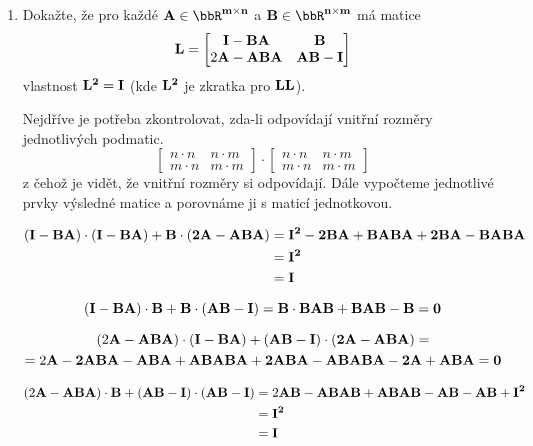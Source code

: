 \begin{enumerate}
    \item Dokažte, že pro každé \( \bf{A} \in \bbR^{m \times n} \) a \( \bf{B} \in \bbR^{n \times m} \) má matice 
    \[
        \bf{L} = 
        \begin{bmatrix}
            \bf{I} - \bf{B} \bf{A} & \bf{B} \\
            2 \bf{A} - \bf{A} \bf{B} \bf{A} & \bf{A} \bf{B} - \bf{I}
        \end{bmatrix}
    \]
    vlastnost \( \bf{L}^2 = \bf{I} \) (kde \( \bf{L}^2 \) je zkratka pro \( \bf{L} \bf{L} \)).

    Nejdříve je potřeba zkontrolovat, zda-li odpovídají vnitřní rozměry jednotlivých podmatic.
    \[
    \begin{bmatrix}
    n \cdot n & n \cdot m \\
    m \cdot n & m \cdot m
    \end{bmatrix}
    \cdot
    \begin{bmatrix}
    n \cdot n & n \cdot m \\
    m \cdot n & m \cdot m
    \end{bmatrix}
    \]
    z čehož je vidět, že vnitřní rozměry si odpovídají. Dále vypočteme jednotlivé prvky výsledné matice a porovnáme ji s maticí jednotkovou.
    
    \begin{align*}
    (\bf{I} - \bf{B}\bf{A}) \cdot (\bf{I} - \bf{B}\bf{A}) + \bf{B} \cdot (2\bf{A} - \bf{A}\bf{B}\bf{A}) &= \bf{I}^2 - 2\bf{B}\bf{A} + \bf{B}\bf{A}\bf{B}\bf{A} + 2\bf{B}\bf{A} - \bf{B}\bf{A}\bf{B}\bf{A} \\
    &= \bf{I}^2 \\
    &= \bf{I}
    \end{align*}
    
    \[
    (\bf{I} -\bf{B}\bf{A}) \cdot \bf{B} + \bf{B} \cdot (\bf{A}\bf{B} - \bf{I}) = \bf{B} \cdot \bf{B}\bf{A}\bf{B} + \bf{B}\bf{A}\bf{B} - \bf{B} = 0
    \]

    \begin{multline*}
    (2\bf{A} - \bf{A}\bf{B}\bf{A}) \cdot (\bf{I} - \bf{B}\bf{A}) + (\bf{A}\bf{B} - \bf{I}) \cdot (2\bf{A} - \bf{A}\bf{B}\bf{A}) = \\
    = 2\bf{A} - 2\bf{A}\bf{B}\bf{A} - \bf{A}\bf{B}\bf{A} + \bf{A}\bf{B}\bf{A}\bf{B}\bf{A} + 2\bf{A}\bf{B}\bf{A} - \bf{A}\bf{B}\bf{A}\bf{B}\bf{A} - 2\bf{A} + \bf{A}\bf{B}\bf{A} = 0
    \end{multline*}

    \begin{align*}
    (2\bf{A} - \bf{A}\bf{B}\bf{A}) \cdot \bf{B} + (\bf{A}\bf{B} - \bf{I}) \cdot (\bf{A}\bf{B} - \bf{I}) &= 2\bf{A}\bf{B} - \bf{A}\bf{B}\bf{A}\bf{B} + \bf{A}\bf{B}\bf{A}\bf{B} - \bf{A}\bf{B} - \bf{A}\bf{B} + \bf{I}^2  \\
    &= \bf{I}^2 \\
    &= \bf{I}
    \end{align*}


\end{enumerate}
